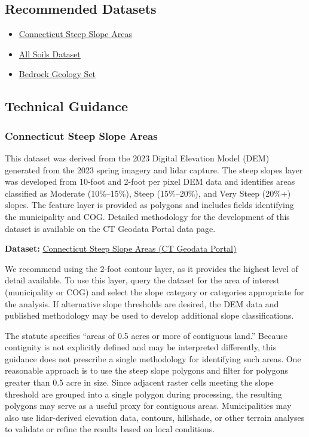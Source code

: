 \documentclass[
  letterpaper,
  DIV=11,
  numbers=noendperiod]{scrreprt}
\providecommand{\tightlist}{%
  \setlength{\itemsep}{0pt}\setlength{\parskip}{0pt}}
\begin{document}
\subsection{Recommended Datasets}\label{recommended-datasets-3}

\begin{itemize}
\tightlist
\item
  \hyperref[sec-connecticut-steep-slope-areas]{Connecticut Steep Slope
  Areas}
\item
  \hyperref[sec-all-soils]{All Soils Dataset}
\item
  \hyperref[sec-bedrock-geology-set]{Bedrock Geology Set}
\end{itemize}

\subsection{Technical Guidance}\label{technical-guidance-3}

\subsubsection{Connecticut Steep Slope
Areas}\label{sec-connecticut-steep-slope-areas}

This dataset was derived from the 2023 Digital Elevation Model (DEM)
generated from the 2023 spring imagery and lidar capture. The steep
slopes layer was developed from 10-foot and 2-foot per pixel DEM data
and identifies areas classified as Moderate (10\%--15\%), Steep
(15\%--20\%), and Very Steep (20\%+) slopes. The feature layer is
provided as polygons and includes fields identifying the municipality
and COG. Detailed methodology for the development of this dataset is
available on the CT Geodata Portal data page.

\textbf{Dataset:}
\href{https://geodata.ct.gov/maps/64e698b122464435a56172f576f3d2a6/about}{Connecticut
Steep Slope Areas (CT Geodata Portal)}

We recommend using the 2-foot contour layer, as it provides the highest
level of detail available. To use this layer, query the dataset for the
area of interest (municipality or COG) and select the slope category or
categories appropriate for the analysis. If alternative slope thresholds
are desired, the DEM data and published methodology may be used to
develop additional slope classifications.

The statute specifies ``areas of 0.5 acres or more of contiguous land.''
Because contiguity is not explicitly defined and may be interpreted
differently, this guidance does not prescribe a single methodology for
identifying such areas. One reasonable approach is to use the steep
slope polygons and filter for polygons greater than 0.5 acre in size.
Since adjacent raster cells meeting the slope threshold are grouped into
a single polygon during processing, the resulting polygons may serve as
a useful proxy for contiguous areas. Municipalities may also use
lidar-derived elevation data, contours, hillshade, or other terrain
analyses to validate or refine the results based on local conditions.
\end{document}
